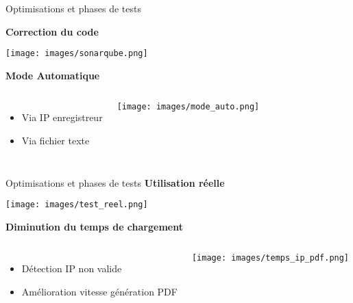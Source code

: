 \begin{frame}{Optimisations et phases de tests}
    
    \vspace*{-0.5cm}
    \textbf{Correction du code}
        \begin{center}
            \texttt{[image: images/sonarqube.png]}
        \end{center}


   
    
    \textbf{Mode Automatique}
    \vspace*{-0.5cm}
    \begin{columns}
        \begin{itemize}
            \item Via IP enregistreur
            \item Via fichier texte
        \end{itemize}
    \begin{center}
        \hspace*{-0.4cm}
        \texttt{[image: images/mode\_auto.png]}
    \end{center}
\end{columns}
\end{frame}


\begin{frame}{Optimisations et phases de tests}
    \vspace*{-0.5cm}
    \textbf{Utilisation réelle}
    \begin{center}
        \vspace*{-0.3cm}
        \texttt{[image: images/test\_reel.png]}
    \end{center}
    \vspace*{-0.3cm}
    \textbf{Diminution du temps de chargement}
    \begin{columns}[t]
        \begin{itemize}
            \item Détection IP non valide
            \item Amélioration vitesse génération PDF
        \end{itemize}
        \begin{center}
            \vspace*{-1cm}
            \texttt{[image: images/temps\_ip\_pdf.png]}
        \end{center}
    \end{columns}
    
    
\end{frame}


